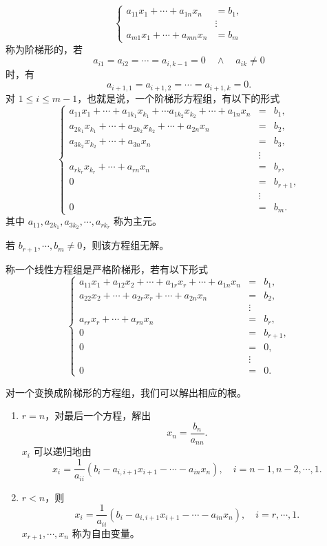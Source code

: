 \newpage
\begin{definition}
	\[
	\left\{
	\begin{aligned}
		a_{11}x_1+\cdots+a_{1n}x_n&=b_1,\\
		&\vdots\\
		a_{m1}x_1+\cdots+a_{mn}x_n&=b_m
	\end{aligned}
	\right.
	\]
	称为阶梯形的，若
	\[
	a_{i1}=a_{i2}=\cdots=a_{i,k-1}=0\quad\land\quad a_{ik}\neq0
	\]
	时，有
	\[
	a_{i+1,1}=a_{i+1,2}=\cdots=a_{i+1,k}=0.
	\]
	对 $1\leq i\leq m-1$，也就是说，一个阶梯形方程组，有以下的形式
	\[
	\left\{
	\begin{array}{rcl}
		a_{11}x_1+\cdots+a_{1k_1}x_{k_1}+\cdots a_{1k_2}x_{k_2}+\cdots+a_{1n}x_n&=&b_1,\\
		a_{2k_1}x_{k_1}+\cdots+a_{2k_2}x_{k_2}+\cdots+a_{2n}x_n&=&b_2,\\
		a_{3k_2}x_{k_2}+\cdots+a_{3n}x_n&=&b_3,\\
		&\vdots&\\
		a_{rk_r}x_{k_r}+\cdots+a_{rn}x_n&=&b_r,\\
		0&=&b_{r+1},\\
		&\vdots&\\
		0&=&b_m.
	\end{array}
	\right.
	\]
	其中 $a_{11},a_{2k_1},a_{3k_2},\cdots,a_{rk_r}$ 称为主元。
	
	若 $b_{r+1},\cdots,b_m\neq0$，则该方程组无解。
	
	称一个线性方程组是严格阶梯形，若有以下形式
	\[
	\left\{
	\begin{array}{rcl}
		a_{11}x_1+a_{12}x_2+\cdots+a_{1r}x_r+\cdots+a_{1n}x_n&=&b_1,\\
		a_{22}x_2+\cdots+a_{2r}x_r+\cdots+a_{2n}x_n&=&b_2,\\
		&\vdots&\\
		a_{rr}x_r+\cdots+a_{rn}x_n&=&b_r,\\
		0&=&b_{r+1},\\
		0&=&0,\\
		&\vdots&\\
		0&=&0.
	\end{array}
	\right.
	\]
	
\end{definition}
对一个变换成阶梯形的方程组，我们可以解出相应的根。
\begin{enumerate}
	\item $r=n$，对最后一个方程，解出
	\[
	x_n=\frac{b_n}{a_{nn}}.
	\]
	$x_i$ 可以递归地由
	\[
	x_i=\frac{1}{a_{ii}}\left(b_i-a_{i,i+1}x_{i+1}-\cdots-a_{in}x_n\right),\quad i=n-1,n-2,\cdots,1.
	\]
	\item $r<n$，则
	\[
	x_i=\frac{1}{a_{ii}}\left(b_i-a_{i,i+1}x_{i+1}-\cdots-a_{in}x_n\right),\quad i=r,\cdots,1.
	\]
	$x_{r+1},\cdots,x_n$ 称为自由变量。
\end{enumerate}
